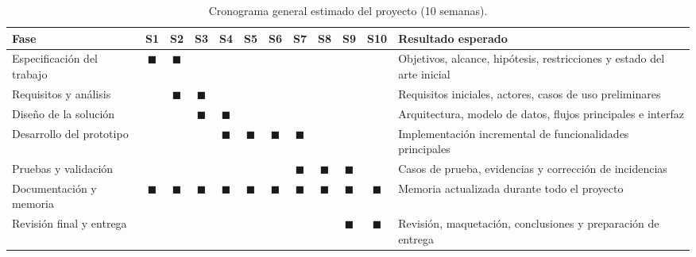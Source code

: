 \begin{table}[h!]
\centering
\scriptsize
\setlength{\tabcolsep}{3pt}
\begin{tabular}{|p{3cm}|c|c|c|c|c|c|c|c|c|c|p{3cm}|}
\hline
\textbf{Fase} & \textbf{S1} & \textbf{S2} & \textbf{S3} & \textbf{S4} & \textbf{S5} & \textbf{S6} & \textbf{S7} & \textbf{S8} & \textbf{S9} & \textbf{S10} & \textbf{Resultado esperado} \\ \hline
Especificación del trabajo            & $\blacksquare$ & $\blacksquare$ &                &                &                &                &                &                &                &                & Objetivos, alcance, hipótesis, restricciones y estado del arte inicial \\ \hline
Requisitos y análisis                 &                & $\blacksquare$ & $\blacksquare$ &                &                &                &                &                &                &                & Requisitos iniciales, actores, casos de uso preliminares \\ \hline
Diseño de la solución                 &                &                & $\blacksquare$ & $\blacksquare$ &                &                &                &                &                &                & Arquitectura, modelo de datos, flujos principales e interfaz \\ \hline
Desarrollo del prototipo              &                &                &                & $\blacksquare$ & $\blacksquare$ & $\blacksquare$ & $\blacksquare$ &                &                &                & Implementación incremental de funcionalidades principales \\ \hline
Pruebas y validación                  &                &                &                &                &                &                & $\blacksquare$ & $\blacksquare$ & $\blacksquare$ &                & Casos de prueba, evidencias y corrección de incidencias \\ \hline
Documentación y memoria               & $\blacksquare$ & $\blacksquare$ & $\blacksquare$ & $\blacksquare$ & $\blacksquare$ & $\blacksquare$ & $\blacksquare$ & $\blacksquare$ & $\blacksquare$ & $\blacksquare$ & Memoria actualizada durante todo el proyecto \\ \hline
Revisión final y entrega              &                &                &                &                &                &                &                &                & $\blacksquare$ & $\blacksquare$ & Revisión, maquetación, conclusiones y preparación de entrega \\ \hline
\end{tabular}
\caption{Cronograma general estimado del proyecto (10 semanas).}
\label{tab:cronograma}
\end{table}

